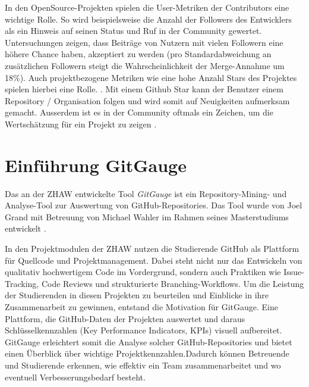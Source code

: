 In den OpenSource-Projekten spielen die User-Metriken der Contributors eine wichtige Rolle. So wird beispielsweise die Anzahl der Followers des Entwicklers als ein Hinweis auf seinen Status und Ruf in der Community gewertet. Untersuchungen zeigen, dass Beiträge von Nutzern mit vielen Followern eine höhere Chance haben, akzeptiert zu werden (pro Standardabweichung an zusätzlichen Followern steigt die Wahrscheinlichkeit der Merge-Annahme um 18\%). Auch projektbezogene Metriken wie eine hohe Anzahl Stars des Projektes spielen hierbei eine Rolle. \parencite{tsay_influence_2014}. Mit einem Github Star kann der Benutzer einem Repository / Organisation folgen und wird somit auf Neuigkeiten aufmerksam gemacht. Ausserdem ist es in der Community oftmals ein Zeichen, um die Wertschätzung für ein Projekt zu zeigen \parencite{noauthor_saving_nodate}.

\section{Einführung GitGauge}
Das an der ZHAW entwickelte Tool \textit{GitGauge} ist ein Repository-Mining- und Analyse-Tool zur Auswertung von GitHub-Repositories. Das Tool wurde von Joel Grand mit Betreuung von Michael Wahler im Rahmen seines Masterstudiums entwickelt \parencite{grand_joel_wahler_michael_waspe_lara_stumpf_simon_repo_nodate}.

In den Projektmodulen der ZHAW nutzen die Studierende GitHub als Plattform für Quellcode und Projektmanagement. Dabei steht nicht nur das Entwickeln von qualitativ hochwertigem Code im Vordergrund, sondern auch Praktiken wie Issue-Tracking, Code Reviews und strukturierte Branching-Workflows. Um die Leistung der Studierenden in diesen Projekten zu beurteilen und Einblicke in ihre Zusammenarbeit zu gewinnen, entstand die Motivation für GitGauge. Eine Plattform, die GitHub-Daten der Projekten auswertet und daraus Schlüsselkennzahlen (Key Performance Indicators, KPIs) visuell aufbereitet. GitGauge erleichtert somit die Analyse solcher GitHub-Repositories und bietet einen Überblick über wichtige Projektkennzahlen.Dadurch können Betreuende und Studierende erkennen, wie effektiv ein Team zusammenarbeitet und wo eventuell Verbesserungsbedarf besteht. \parencite{grand_joel_vt1_joelgrand_repository_2024}


